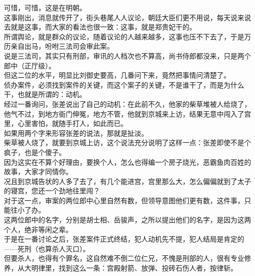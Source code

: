 \begin{multicols}{\theparacolNo}
可惜，可惜，这是在明朝。\\

这事刚出，消息就传开了，街头巷尾人人议论，朝廷大臣们更不用说，每天说来说去就是这事，而大家的看法也很一致：这事，就是郑贵妃干的。\\

所谓舆论，就是群众的议论，随着议论的人越来越多，这事也压不下去了，于是万历亲自出马，吩咐三法司会审此案。\\

说是三法司，其实只有刑部，审讯的人档次也不算高，尚书侍郎都没来，只是两个郎中（正厅级）。\\

但这二位的水平，明显比刘御史要高，几番问下来，竟然把事情问清楚了。\\

侦办案件，必须找到案件的关键，而这个案子的关键，不是谁干了，而是为什么干，也就是所谓的：动机。\\

经过一番询问，张差说出了自己的动机：在此前不久，他家的柴草堆被人给烧了，他气不过，到地方衙门伸冤，地方不管，他就到京城来上访，结果无意中闯入了宫里，心里害怕，就随手打人，如此而已。\\

如果用两个字来形容张差的说法，那就是扯淡。\\

柴草被人烧了，就要到京城上访，这个说法充分说明了这样一点：张差即使不是个疯子，也是个傻子。\\

因为这实在不算个好理由，要换个人，怎么也得编一个房子烧光，恶霸鱼肉百姓的故事，大家才同情你。\\

况且到京城告状的人多了去了，有几个能进宫，宫里那么大，怎么偏偏就到了太子的寝宫，您还一个劲地往里闯？\\

对于这一点，审案的两位郎中心里自然有数，但领导意图他们更有数，这件事，只能往小了办。\\

这两位郎中的名字，分别是胡士相、岳骏声，之所以提出他们的名字，是因为这两个人，绝非等闲之辈。\\

于是在一番讨论之后，张差案件正式终结，犯人动机先不提，犯人结局是肯定的——死刑（也算杀人灭口）。\\

但要杀人，也得有个罪名，这自然难不倒二位仁兄，不愧是刑部的人，很有专业修养，从大明律里，找到这么一条：宫殿射箭、放弹、投砖石伤人者，按律斩。\\


\end{multicols}
